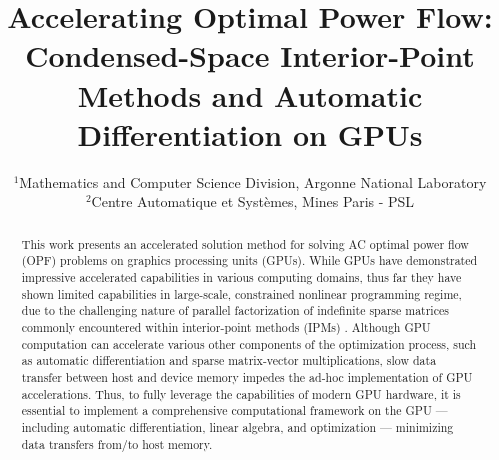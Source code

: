 
\title{\Large Accelerating Optimal Power Flow: Condensed-Space Interior-Point Methods and Automatic Differentiation on GPUs}

\author{
}
\date{\small
  $^{1}$Mathematics and Computer Science Division, Argonne National Laboratory\\
  $^{2}$Centre Automatique et Syst\`{e}mes, Mines Paris - PSL
}

\maketitle

\begin{abstract}
This work presents an accelerated solution method for solving AC optimal power flow (OPF) problems on graphics processing units (GPUs). While GPUs have demonstrated impressive accelerated capabilities in various computing domains, thus far they have shown limited capabilities in large-scale, constrained nonlinear programming regime, due to the challenging nature of parallel factorization of indefinite sparse matrices commonly encountered within interior-point methods (IPMs) \cite{anitescu2021targeting}. Although GPU computation can accelerate various other components of the optimization process, such as automatic differentiation and sparse matrix-vector multiplications, slow data transfer between host and device memory impedes the ad-hoc implementation of GPU accelerations. Thus, to fully leverage the capabilities of modern GPU hardware, it is essential to implement a comprehensive computational framework on the GPU --- including automatic differentiation, linear algebra, and optimization --- minimizing data transfers from/to host memory.
\end{abstract}

